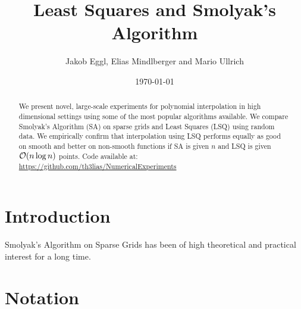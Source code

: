 \documentclass[12pt, oneside]{amsart}
\theoremstyle{definition}
\theoremstyle{remark}
\numberwithin{equation}{section}
\begin{document}
\title{Least Squares and Smolyak's Algorithm} %


\author{Jakob Eggl, Elias Mindlberger and Mario Ullrich}
\date{\today}


%
%



\begin{abstract}
We present novel, large-scale experiments for polynomial interpolation in high 
dimensional settings using some of the most popular algorithms available. We 
compare Smolyak's Algorithm (SA) on sparse grids and Least Squares (LSQ) using 
random data. We empirically confirm that interpolation using LSQ performs 
equally as good on smooth and better on non-smooth functions if SA is given 
\(n\) and LSQ is given \(\mathcal{O}(n \log n)\) points.\newline
Code available at: 
\url{https://github.com/th3lias/NumericalExperiments}
\end{abstract}

\maketitle


\section{Introduction}
Smolyak's Algorithm on Sparse Grids has been of high theoretical and practical 
interest for a long time. %


\section{Notation}
\end{document}
